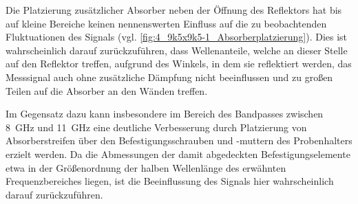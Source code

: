 Die Platzierung zusätzlicher Absorber neben der Öffnung des Reflektors hat bis auf kleine Bereiche keinen nennenswerten Einfluss auf die zu beobachtenden Fluktuationen des Signals (vgl. \Abb\ref{fig:4_9k5x9k5-1_Absorberplatzierung}). Dies ist wahrscheinlich darauf zurückzuführen, dass Wellenanteile, welche an dieser Stelle auf den Reflektor treffen, aufgrund des Winkels, in dem sie reflektiert werden, das Messsignal auch ohne zusätzliche Dämpfung nicht beeinflussen und zu großen Teilen auf die Absorber an den Wänden treffen.
\par
\vspace{\linespace}
Im Gegensatz dazu kann insbesondere im Bereich des Bandpasses zwischen \SI{8}{\giga\hertz} und  \SI{11}{\giga\hertz} eine deutliche Verbesserung durch Platzierung von Absorberstreifen über den Befestigungsschrauben und -muttern des Probenhalters erzielt werden. Da die Abmessungen der damit abgedeckten Befestigungselemente etwa in der Größenordnung der halben Wellenlänge des erwähnten Frequenzbereiches liegen, ist die Beeinflussung des Signals hier wahrscheinlich darauf zurückzuführen. 
\par
\vspace{\linespace}

